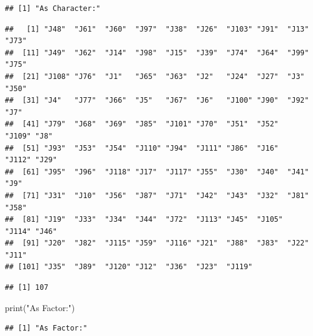 \documentclass[
]{book}
\newenvironment{Shaded}{\begin{snugshade}}{\end{snugshade}}
\newcommand{\FunctionTok}[1]{\textcolor[rgb]{0.00,0.00,0.00}{#1}}
\newcommand{\NormalTok}[1]{#1}
\newcommand{\SpecialCharTok}[1]{\textcolor[rgb]{0.00,0.00,0.00}{#1}}
\newcommand{\StringTok}[1]{\textcolor[rgb]{0.31,0.60,0.02}{#1}}
\begin{document}
\begin{verbatim}
## [1] "As Character:"
\end{verbatim}

\begin{Shaded}
\end{Shaded}

\begin{verbatim}
##   [1] "J48"  "J61"  "J60"  "J97"  "J38"  "J26"  "J103" "J91"  "J13"  "J73" 
##  [11] "J49"  "J62"  "J14"  "J98"  "J15"  "J39"  "J74"  "J64"  "J99"  "J75" 
##  [21] "J108" "J76"  "J1"   "J65"  "J63"  "J2"   "J24"  "J27"  "J3"   "J50" 
##  [31] "J4"   "J77"  "J66"  "J5"   "J67"  "J6"   "J100" "J90"  "J92"  "J7"  
##  [41] "J79"  "J68"  "J69"  "J85"  "J101" "J70"  "J51"  "J52"  "J109" "J8"  
##  [51] "J93"  "J53"  "J54"  "J110" "J94"  "J111" "J86"  "J16"  "J112" "J29" 
##  [61] "J95"  "J96"  "J118" "J17"  "J117" "J55"  "J30"  "J40"  "J41"  "J9"  
##  [71] "J31"  "J10"  "J56"  "J87"  "J71"  "J42"  "J43"  "J32"  "J81"  "J58" 
##  [81] "J19"  "J33"  "J34"  "J44"  "J72"  "J113" "J45"  "J105" "J114" "J46" 
##  [91] "J20"  "J82"  "J115" "J59"  "J116" "J21"  "J88"  "J83"  "J22"  "J11" 
## [101] "J35"  "J89"  "J120" "J12"  "J36"  "J23"  "J119"
\end{verbatim}

\begin{Shaded}
\end{Shaded}

\begin{verbatim}
## [1] 107
\end{verbatim}

\begin{Shaded}
\begin{Highlighting}[]
\FunctionTok{print}\NormalTok{(}\StringTok{"As Factor:"}\NormalTok{)}
\end{Highlighting}
\end{Shaded}

\begin{verbatim}
## [1] "As Factor:"
\end{verbatim}

\begin{Shaded}
\end{Shaded}
\end{document}
